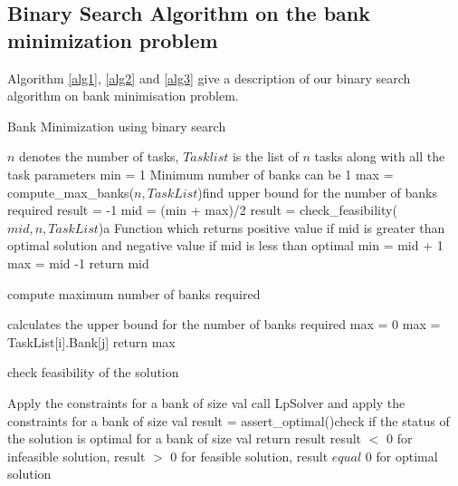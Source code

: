 \subsection{Binary Search Algorithm on the bank minimization problem}\label{bsa}
Algorithm \ref{alg1}, \ref{alg2} and \ref{alg3} give a description of our binary search algorithm on bank minimisation 
problem.
\begin{algorithm}
 \caption{Bank Minimization using binary search}
  \begin{algorithmic}[1]
    \Comment $n$ denotes the number of tasks, $Tasklist$ is the list of $n$ tasks along 
    with all the task parameters
    \State min = 1 \Comment Minimum number of banks can be 1
     \State max = compute\_max\_banks($n, TaskList$)\Comment find upper bound for the number of banks required
      \State result = -1 
       \State mid = (min + max)/2
        \State result = check\_feasibility($mid,n,TaskList$)\Comment a Function which returns positive value if mid is greater than optimal solution and negative value if mid is less than optimal
          \State min = mid + 1
            \State max = mid -1
               \EndIf
                \EndWhile
                 \State return mid
                 \EndFunction
  \end{algorithmic}
 \label{alg1}
\end{algorithm}

\begin{algorithm}
\caption{compute maximum number of banks required}
 \begin{algorithmic}[1]
   \Comment calculates the upper bound for the number of banks required
    \State max = 0
        \State max = TaskList[i].Bank[j]
         \EndIf
          \EndFor
           \EndFor
            \State return max   
             \EndFunction
  \end{algorithmic}
 \label{alg2}
\end{algorithm}

\begin{algorithm}
 \caption{check feasibility of the solution}
  \begin{algorithmic}[1]
       \State Apply the constraints for a bank of size val \Comment call LpSolver and apply the constraints for a bank of size val 
        \EndFor
         \EndFor
          \EndFor
           \State result = assert\_optimal()\Comment check if the status of the solution is optimal for a bank of size val 
            \State return result \Comment result $<$ 0 for infeasible solution, result $>$ 0 for feasible solution, result $equal$ 0 for optimal solution 
             \EndFunction
  \end{algorithmic}
 \label{alg3}
\end{algorithm}

